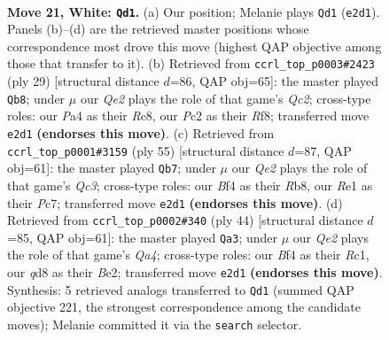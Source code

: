 \documentclass[11pt]{article}
\begin{document}
\clearpage

\begin{figure}[p]\centering
\begin{subfigure}{0.46\textwidth}\centering
\resizebox{\linewidth}{!}{%
\newchessgame
\chessboard[
  setfen={r1bqk2r/5p2/1p2pnp1/p1b4p/P4B1P/1P1B2P1/2PNQPK1/R3R3 w q - 9 21},
  showmover=false,
  pgfstyle=straightmove, color=movearrow, markmove={e2-d1}
]}
\caption{}
\end{subfigure}\hfill
\begin{subfigure}{0.46\textwidth}\centering
\resizebox{\linewidth}{!}{%
\newchessgame
\chessboard[
  setfen={2r2rk1/2qpbppp/p1b1p3/1p1nP3/3BNP2/P5Q1/1PP1B1PP/R3K2R b KQ - 4 15},
  showmover=false,
  pgfstyle=straightmove, color=movearrow, markmove={c7-b8}
]}
\caption{}
\end{subfigure}
\\[4pt]
\begin{subfigure}{0.46\textwidth}\centering
\resizebox{\linewidth}{!}{%
\newchessgame
\chessboard[
  setfen={1r4k1/2p2rp1/2qbbp1p/4p3/p3P2N/P1B3PP/1P1RPPK1/1QR5 b - - 11 28},
  showmover=false,
  pgfstyle=straightmove, color=movearrow, markmove={c6-b7}
]}
\caption{}
\end{subfigure}\hfill
\begin{subfigure}{0.46\textwidth}\centering
\resizebox{\linewidth}{!}{%
\newchessgame
\chessboard[
  setfen={2r3k1/p2rqpb1/1p1p1np1/1P2pb1p/QBP5/4P2P/P2NBPP1/2RR2K1 w - - 1 23},
  showmover=false,
  pgfstyle=straightmove, color=movearrow, markmove={a4-a3}
]}
\caption{}
\end{subfigure}
\caption{\textbf{Move 21, White: \texttt{Qd1}.} (a) Our position; Melanie plays \texttt{Qd1} (\texttt{e2d1}). Panels (b)--(d) are the retrieved master positions whose correspondence most drove this move (highest QAP objective among those that transfer to it). (b) Retrieved from \texttt{ccrl\_top\_p0003\#2423} (ply 29) [structural distance $d$=86, QAP obj=65]: the master played \texttt{Qb8}; under $\mu$ our \emph{Qe2} plays the role of that game's \emph{Qc2}; cross-type roles: our \emph{P}a4 as their \emph{R}c8, our \emph{P}c2 as their \emph{R}f8; transferred move \texttt{e2d1} \textbf{(endorses this move)}. (c) Retrieved from \texttt{ccrl\_top\_p0001\#3159} (ply 55) [structural distance $d$=87, QAP obj=61]: the master played \texttt{Qb7}; under $\mu$ our \emph{Qe2} plays the role of that game's \emph{Qc3}; cross-type roles: our \emph{B}f4 as their \emph{R}b8, our \emph{R}e1 as their \emph{P}c7; transferred move \texttt{e2d1} \textbf{(endorses this move)}. (d) Retrieved from \texttt{ccrl\_top\_p0002\#340} (ply 44) [structural distance $d$=85, QAP obj=61]: the master played \texttt{Qa3}; under $\mu$ our \emph{Qe2} plays the role of that game's \emph{Qa4}; cross-type roles: our \emph{B}f4 as their \emph{R}c1, our \emph{q}d8 as their \emph{B}e2; transferred move \texttt{e2d1} \textbf{(endorses this move)}. Synthesis: 5 retrieved analogs transferred to \texttt{Qd1} (summed QAP objective 221, the strongest correspondence among the candidate moves); Melanie committed it via the \texttt{search} selector.}
\label{fig:thought-m40}
\end{figure}
\end{document}
